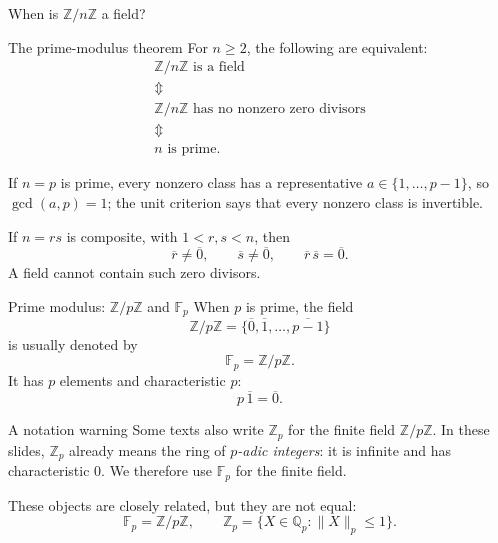 \documentclass[aspectratio=169,11pt]{beamer}
\newcommand{\Z}{\mathbb Z}
\newcommand{\Q}{\mathbb Q}
\begin{document}
\begin{frame}{When is \(\Z/n\Z\) a field?}
  \begin{block}{The prime-modulus theorem}
    For \(n\ge2\), the following are equivalent:
    \[
      \boxed{
      \begin{array}{c}
        \Z/n\Z\text{ is a field}\\[0.2em]
        \Updownarrow\\[-0.1em]
        \Z/n\Z\text{ has no nonzero zero divisors}\\[0.2em]
        \Updownarrow\\[-0.1em]
        n\text{ is prime.}
      \end{array}}
    \]
  \end{block}

  If \(n=p\) is prime, every nonzero class has a representative
  \(a\in\{1,\ldots,p-1\}\), so \(\gcd(a,p)=1\); the unit criterion says
  that every nonzero class is invertible.

  If \(n=rs\) is composite, with \(1<r,s<n\), then
  \[
    \overline r\ne\overline0,\qquad
    \overline s\ne\overline0,\qquad
    \overline r\,\overline s=\overline0.
  \]
  A field cannot contain such zero divisors.
\end{frame}

\begin{frame}{Prime modulus: \(\Z/p\Z\) and \(\mathbb F_p\)}
  When \(p\) is prime, the field
  \[
    \Z/p\Z=\{\overline0,\overline1,\ldots,\overline{p-1}\}
  \]
  is usually denoted by
  \[
    \boxed{\mathbb F_p=\Z/p\Z.}
  \]
  It has \(p\) elements and characteristic \(p\):
  \[
    p\,\overline1=\overline0.
  \]

  \begin{alertblock}{A notation warning}
    Some texts also write \(\Z_p\) for the finite field
    \(\Z/p\Z\).  In these slides, \(\Z_p\) already means the ring of
    \emph{\(p\)-adic integers}: it is infinite and has characteristic
    \(0\).  We therefore use \(\mathbb F_p\) for the finite field.
  \end{alertblock}

  These objects are closely related, but they are not equal:
  \[
    \mathbb F_p=\Z/p\Z,
    \qquad
    \Z_p=\{X\in\Q_p:\|X\|_p\le1\}.
  \]
\end{frame}
\end{document}
